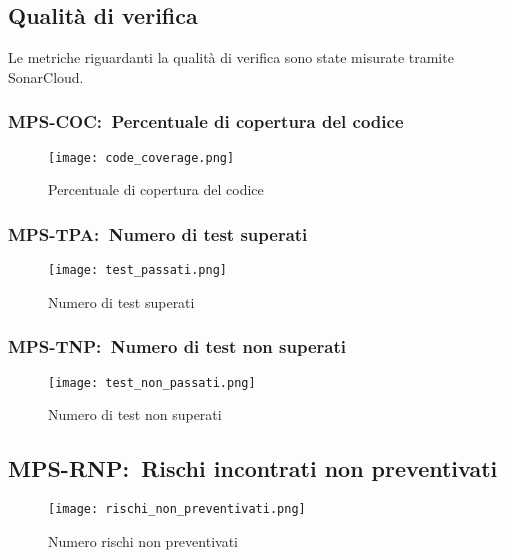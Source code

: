 \documentclass[../piano-di-qualifica.tex]{subfiles}
\begin{document}
\newpage


\subsection{Qualità di verifica}%
\label{sub:qualita_verifica_report}
Le metriche riguardanti la qualità di verifica sono state misurate tramite SonarCloud.

\subsubsection{MPS-COC:~Percentuale di copertura del codice}%
\label{subs:percentuale_cop_codice}
\begin{figure}[H]
  \centering
  \texttt{[image: code\_coverage.png]}%
  \caption{Percentuale di copertura del codice}%
  \label{fig:percentuale_cop_codice}%
\end{figure}

\subsubsection{MPS-TPA:~Numero di test superati}%
\label{subs:test_non_superati}
\begin{figure}[H]
  \centering
  \texttt{[image: test\_passati.png]}%
  \caption{Numero di test superati}%
  \label{fig:test_non_superati}%
\end{figure}

\subsubsection{MPS-TNP:~Numero di test non superati}%
\label{subs:test_superati}
\begin{figure}[H]
  \centering
  \texttt{[image: test\_non\_passati.png]}%
  \caption{Numero di test non superati}%
  \label{fig:test_superati}%
\end{figure}





\subsection{MPS-RNP:~Rischi incontrati non preventivati}%
\label{sub:rischi_non_preventivati_report}

\begin{figure}[H]
  \centering
  \texttt{[image: rischi\_non\_preventivati.png]}%
  \caption{Numero rischi non preventivati}%
  \label{fig:rischi_non_preventivati}%
\end{figure}
\end{document}
